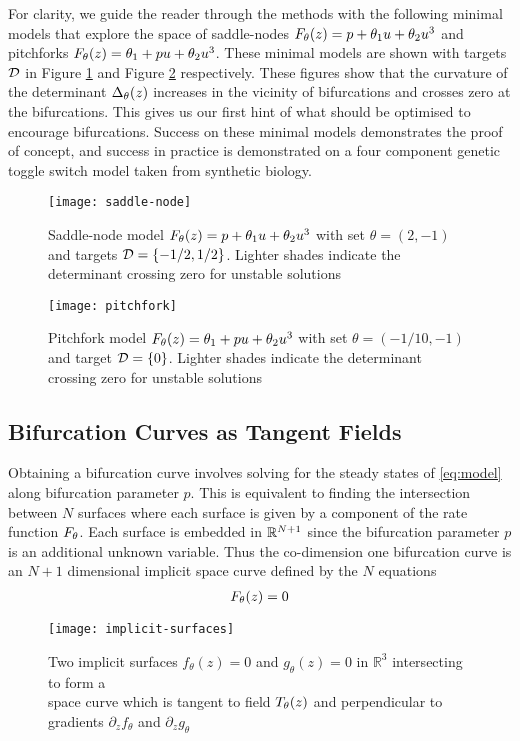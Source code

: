 For clarity, we guide the reader through the methods with the following minimal models that explore the space of saddle-nodes $F_{\theta}(z) = p + \theta_{1}u+\theta_{2}u^3$ and pitchforks $F_{\theta}(z) = \theta_{1} + p u+\theta_{2}u^3$. These minimal models are shown with targets $\mathcal{D}$ in Figure \ref{fig:saddle-node} and Figure \ref{fig:pitchfork} respectively. These figures show that the curvature of the determinant $\Delta_{\theta}(z)$ increases in the vicinity of bifurcations and crosses zero at the bifurcations. This gives us our first hint of what should be optimised to encourage bifurcations. Success on these minimal models demonstrates the proof of concept, and success in practice is demonstrated on a four component genetic toggle switch model taken from synthetic biology.
\begin{figure}[H]
\centering{}
\captionsetup{justification=centering}
\texttt{[image: saddle-node]}
\caption{Saddle-node model $F_{\theta}(z) = p + \theta_{1}u+\theta_{2}u^3$ with set $\theta=(2,-1)$ and targets $\mathcal{D}=\{-1/2,1/2\}$. Lighter shades indicate the determinant crossing zero for unstable solutions}
\label{fig:saddle-node}
\end{figure}
\begin{figure}[H]
\centering{}
\captionsetup{justification=centering}
\texttt{[image: pitchfork]}
\caption{Pitchfork model $F_{\theta}(z) = \theta_{1} + p u+\theta_{2}u^3$ with set $\theta=(-1/10,-1)$ and target $\mathcal{D}=\{0\}$. Lighter shades indicate the determinant crossing zero for unstable solutions}
\label{fig:pitchfork}
\end{figure}

\subsection{Bifurcation Curves as Tangent Fields}
Obtaining a bifurcation curve involves solving for the steady states of \eqref{eq:model} along bifurcation parameter $p$. This is equivalent to finding the intersection between $N$ surfaces where each surface is given by a component of the rate function $F_{\theta}$. Each surface is embedded in $\mathbb{R}^{N+1}$ since the bifurcation parameter $p$ is an additional unknown variable. Thus the co-dimension one bifurcation curve is an $N+1$ dimensional implicit space curve defined by the $N$ equations
\begin{align}
    F_{\theta}(z) = 0
\end{align}

\begin{figure}[H]
\centering{}
\captionsetup{justification=centering}
\texttt{[image: implicit-surfaces]}
\caption{Two implicit surfaces $f_{\theta}(z)=0$ and $g_{\theta}(z)=0$ in $\mathbb{R}^3$ intersecting to form a\\ space curve which is tangent to field $T_{\theta}(z)$ and perpendicular to gradients $\partial_{z}f_{\theta}$ and $\partial_{z}g_{\theta}$}
\label{fig:implicit-surfaces}
\end{figure}

